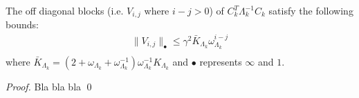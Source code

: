 \begin{proposition} \label{p:intermediateDecay}
The off diagonal blocks (i.e. $V_{i,j}$ where $i - j > 0$) of $C_k^T \Lambda_k^{-1} C_k$ satisfy the following bounds:
\begin{subequations}
\begin{align}
\| V_{i,j} \|_\bullet \leq \gamma^2 \bar{K}_{\Lambda_k} \omega_{\Lambda_k}^{i-j} \\
\end{align}
\end{subequations}
where $\bar{K}_{\Lambda_k} = (2 + \omega_{\Lambda_k} + \omega_{\Lambda_k}^{-1}) \omega_{\Lambda_k}^{-1} K_{\Lambda_k}$ and $\bullet$ represents $\infty$ and $1$.
\end{proposition}
\begin{proof}
Bla bla bla
\qed
\end{proof}


